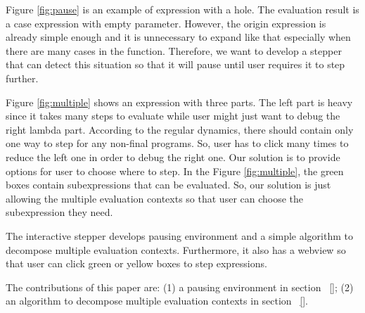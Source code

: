 
Figure \ref{fig:pause} is an example of expression with a hole. The evaluation result is a case expression with empty parameter. However, the origin expression is already simple enough and it is unnecessary to expand like that especially when there are many cases in the function. Therefore, we want to develop a stepper that can detect this situation so that it will pause until user requires it to step further.

Figure \ref{fig:multiple} shows an expression with three parts. The left part is heavy since it takes many steps to evaluate while user might just want to debug the right lambda part. According to the regular dynamics, there should contain only one way to step for any non-final programs. So, user has to click many times to reduce the left one in order to debug the right one. Our solution is to provide options for user to choose where to step. In the Figure \ref{fig:multiple}, the green boxes contain subexpressions that can be evaluated. So, our solution is just allowing the multiple evaluation contexts so that user can choose the subexpression they need.

The interactive stepper develops pausing environment and a simple algorithm to decompose multiple evaluation contexts. Furthermore, it also has a webview so that user can click green or yellow boxes to step expressions. 

 The contributions of this paper are: (1) a pausing environment in section ~\ref{}; (2) an algorithm to decompose multiple evaluation contexts in section ~\ref{}.